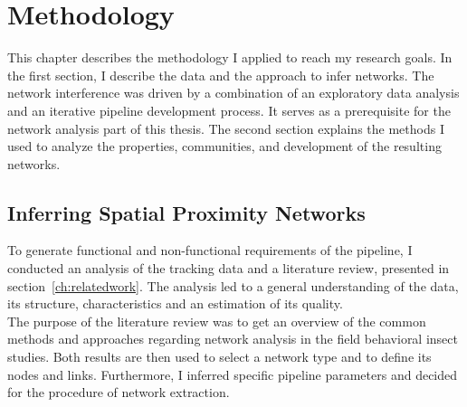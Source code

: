 \chapter{Methodology}
\label{ch:approach}

This chapter describes the methodology I applied to reach my research goals. 
In the first section, I describe the data and the approach to infer networks.
The network interference was driven by a combination of an exploratory data analysis and an iterative pipeline development process.
It serves as a prerequisite for the network analysis part of this thesis.
The second section explains the methods I used to analyze the properties, communities, and development of the resulting networks.

\section{Inferring Spatial Proximity Networks}
\label{sec:infNetworks}
To generate functional and non-functional requirements of the pipeline, I conducted an analysis of the tracking data and a literature review, presented in section~\ref{ch:relatedwork}.
The analysis led to a general understanding of the data, its structure, characteristics and an estimation of its quality.\\
The purpose of the literature review was to get an overview of the common methods and approaches regarding network analysis in the field behavioral insect studies.
Both results are then used to select a network type and to define its nodes and links.
Furthermore, I inferred specific pipeline parameters and decided for the procedure of network extraction.


